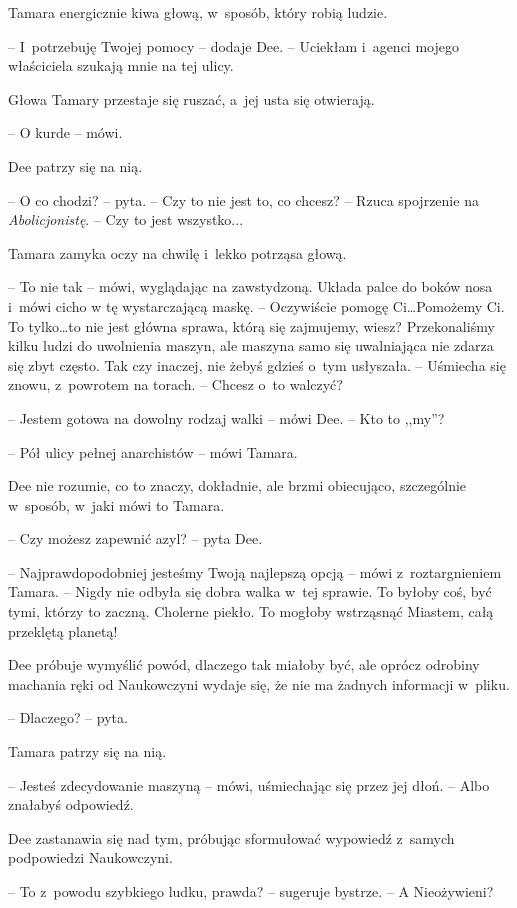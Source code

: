 \documentclass[oneside,polish,11pt,sfheadings]{mwbk}
\begin{document}
Tamara energicznie kiwa głową, w~sposób, który robią ludzie.

-- I~potrzebuję Twojej pomocy -- dodaje Dee. -- Uciekłam i~agenci mojego
właściciela szukają mnie na tej ulicy.

Głowa Tamary przestaje się ruszać, a~jej usta się otwierają.

-- O kurde -- mówi.

Dee patrzy się na nią. 

-- O co chodzi? -- pyta. -- Czy to nie jest to, co
chcesz? -- Rzuca spojrzenie na \emph{Abolicjonistę}. -- Czy to jest
wszystko...

Tamara zamyka oczy na chwilę i~lekko potrząsa głową. 

-- To nie tak -- mówi, wyglądając na zawstydzoną. Układa palce do boków nosa i~mówi cicho
w tę wystarczającą maskę. -- Oczywiście pomogę Ci\ldots Pomożemy Ci. To
tylko\ldots to nie jest główna sprawa, którą się zajmujemy, wiesz?
Przekonaliśmy kilku ludzi do uwolnienia maszyn, ale maszyna samo się
uwalniająca nie zdarza się zbyt często. Tak czy inaczej, nie żebyś
gdzieś o~tym usłyszała. -- Uśmiecha się znowu, z~powrotem na torach. -- Chcesz o~to walczyć?

-- Jestem gotowa na dowolny rodzaj walki -- mówi Dee. -- Kto to ,,my''?

-- Pół ulicy pełnej anarchistów -- mówi Tamara.

Dee nie rozumie, co to znaczy, dokładnie, ale brzmi obiecująco,
szczególnie w~sposób, w~jaki mówi to Tamara.

-- Czy możesz zapewnić azyl? -- pyta Dee.

-- Najprawdopodobniej jesteśmy Twoją najlepszą opcją -- mówi z~roztargnieniem Tamara. -- Nigdy nie odbyła się dobra walka w~tej sprawie.
To byłoby coś, być tymi, którzy to zaczną. Cholerne piekło. To mogłoby
wstrząsnąć Miastem, całą przeklętą planetą!

Dee próbuje wymyślić powód, dlaczego tak miałoby być, ale oprócz
odrobiny machania ręki od Naukowczyni wydaje się, że nie ma żadnych
informacji w~pliku.

-- Dlaczego? -- pyta.

Tamara patrzy się na nią. 

-- Jesteś zdecydowanie maszyną -- mówi,
uśmiechając się przez jej dłoń. -- Albo znałabyś odpowiedź.

Dee zastanawia się nad tym, próbując sformułować wypowiedź z~samych
podpowiedzi Naukowczyni.

-- To z~powodu szybkiego ludku, prawda? -- sugeruje bystrze. -- A
Nieożywieni?
\end{document}
